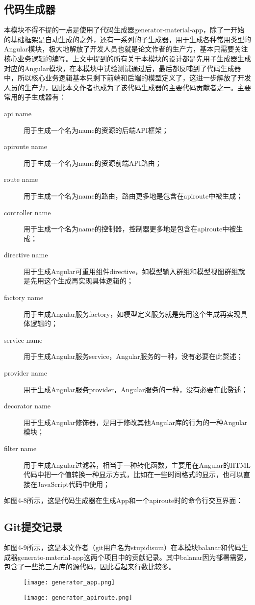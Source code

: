 \subsection{代码生成器}
本模块不得不提的一点是使用了代码生成器generator-material-app，除了一开始的基础框架是自动生成的之外，还有一系列的子生成器，用于生成各种常用类型的Angular模块，极大地解放了开发人员也就是论文作者的生产力，基本只需要关注核心业务逻辑的编写。上文中提到的所有关于本模块的设计都是先用子生成器生成对应的Angular模块，在本模块中试验测试通过后，最后都反哺到了代码生成器中，所以核心业务逻辑基本只剩下前端和后端的模型定义了，这进一步解放了开发人员的生产力，因此本文作者也成为了该代码生成器的主要代码贡献者之一。主要常用的子生成器有：
\begin{description}
  \item[api name] 用于生成一个名为name的资源的后端API框架；
  \item[apiroute name] 用于生成一个名为name的资源前端API路由；
  \item[route name] 用于生成一个名为name的路由，路由更多地是包含在apiroute中被生成；
  \item[controller name] 用于生成一个名为name的控制器，控制器更多地是包含在apiroute中被生成；
  \item[directive name] 用于生成Angular可重用组件directive，如模型输入群组和模型视图群组就是先用这个生成再实现具体逻辑的；
  \item[factory name] 用于生成Angular服务factory，如模型定义服务就是先用这个生成再实现具体逻辑的；
  \item[service name] 用于生成Angular服务service，Angular服务的一种，没有必要在此赘述；
  \item[provider name] 用于生成Angular服务provider，Angular服务的一种，没有必要在此赘述；
  \item[decorator name] 用于生成Angular修饰器，是用于修改其他Angular库的行为的一种Angular模块；
  \item[filter name] 用于生成Angular过滤器，相当于一种转化函数，主要用在Angular的HTML代码中把一个值转换一种显示方式，比如在一些时间格式的显示，也可以直接在JavaScript代码中使用；
\end{description}

如图4-8所示，这是代码生成器在生成App和一个apiroute时的命令行交互界面：
\subsection{Git提交记录}
如图4-9所示，这是本文作者（git用户名为stupidisum）在本模块balanar和代码生成器generato-material-app这两个项目中的贡献记录。其中balanar因为部署需要，包含了一些第三方库的源代码，因此看起来行数比较多。
\begin{figure}[!htp]
 \centering
 \texttt{[image: generator\_app.png]}

 \vspace{0.1cm}

 \texttt{[image: generator\_apiroute.png]}
\end{figure}


